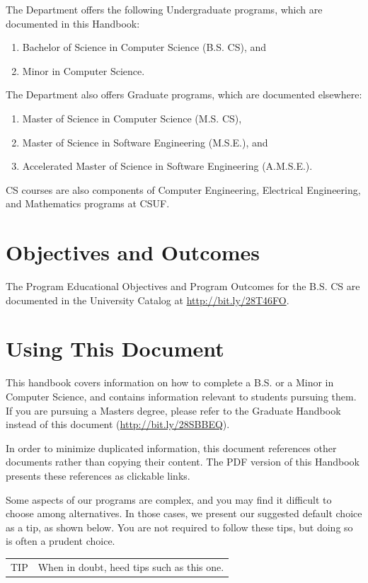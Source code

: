 \documentclass{book}
\newenvironment{tip}{
  \tcolorbox \begin{tabular}{m{.5in} m{5.25in}}
    \Large{TIP} &
}{
  \end{tabular} \endtcolorbox
}
\newcommand{\CampusName}{CSUF}
\begin{document}
The Department offers the following Undergraduate programs, which are documented in this Handbook:
\begin{enumerate}
\item Bachelor of Science in Computer Science (B.S. CS), and
\item Minor in Computer Science.
\end{enumerate}

The Department also offers Graduate programs, which are documented elsewhere:
\begin{enumerate}
\item Master of Science in Computer Science (M.S. CS),
\item Master of Science in Software Engineering (M.S.E.), and
\item Accelerated Master of Science in Software Engineering (A.M.S.E.).
\end{enumerate}

CS courses are also components of Computer Engineering, Electrical Engineering, and Mathematics programs at \CampusName.

\section{Objectives and Outcomes}
 
The Program Educational Objectives and Program Outcomes for the B.S. CS are documented in the University Catalog at \url{http://bit.ly/28T46FO}.

\section{Using This Document}

This handbook covers information on how to complete a B.S. or a Minor in Computer Science, and contains information relevant to students pursuing them. If you are pursuing a Masters degree, please refer to the Graduate Handbook instead of this document (\href{http://www.fullerton.edu/ecs/cs/_resources/pdf/CS_GradHandbook_Fall15Version3.pdf}{\url{http://bit.ly/28SBBEQ}}).

In order to minimize duplicated information, this document references other documents rather than copying their content. The PDF version of this Handbook presents these references as clickable links.

Some aspects of our programs are complex, and you may find it difficult to choose among alternatives. In those cases, we present our suggested default choice as a tip, as shown below. You are not required to follow these tips, but doing so is often a prudent choice.
\begin{tip}
When in doubt, heed tips such as this one.
\end{tip}
\end{document}
